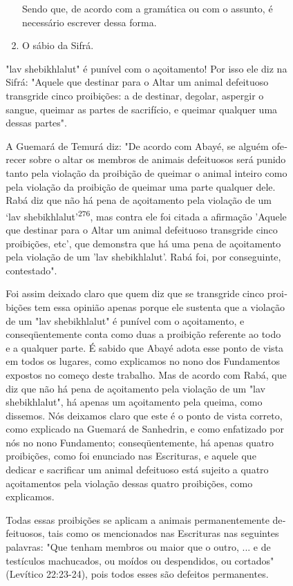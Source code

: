 \begin{itemize}
\begin{enumrate}
\begin{itemize}
\begin{itemize}
\begin{itemize}
\begin{enumerate}
 Sendo que, de acordo com a gramática ou com o assunto, é necessário
 escrever dessa forma.
 
\item
 
 O sábio da Sifrá.
 
\end{enumerate}



"lav shebikhlalut" é punível com o açoitamento! Por isso ele diz na
Sifrá: "Aquele que destinar para o Altar um animal defeituoso transgride
cinco proibições: a de destinar, degolar, aspergir o sangue, queimar as
partes de sacrifício, e quei­mar qualquer uma dessas partes".

A Guemará de Temurá diz: "De acordo com Abayé, se alguém ofe­recer sobre
o altar os membros de animais defeituosos será punido tanto pela
violação da proibição de queimar o animal inteiro como pela violação da
proi­bição de queimar uma parte qualquer dele. Rabá diz que não há pena
de açoita­mento pela violação de um `lav
shebikhlalut'\textsuperscript{276}, mas contra ele foi citada a
afir­mação 'Aquele que destinar para o Altar um animal defeituoso
transgride cinco proibições, etc', que demonstra que há uma pena de
açoitamento pela violação de um 'lav shebikhlalut'. Rabá foi, por
conseguinte, contestado".

Foi assim deixado claro que quem diz que se transgride cinco proi­bições
tem essa opinião apenas porque ele sustenta que a violação de um "lav
shebikhlalut" é punível com o açoitamento, e conseqüentemente conta como
duas a proibição referente ao todo e a qualquer parte. É sabido que
Abayé ado­ta esse ponto de vista em todos os lugares, como explicamos no
nono dos Fun­damentos expostos no começo deste trabalho. Mas de acordo
com Rabá, que diz que não há pena de açoitamento pela violação de um
"lav shebikhlalut", há apenas um açoitamento pela queima, como dissemos.
Nós deixamos claro que este é o ponto de vista correto, como explicado
na Guemará de Sanhedrin, e como enfatizado por nós no nono Fundamento;
conseqüentemente, há ape­nas quatro proibições, como foi enunciado nas
Escrituras, e aquele que dedicar e sacrificar um animal defeituoso está
sujeito a quatro açoitamentos pela viola­ção dessas quatro proibições,
como explicamos.

Todas essas proibições se aplicam a animais permanentemente
de­feituosos, tais como os mencionados nas Escrituras nas seguintes
palavras: "Que tenham membros ou maior que o outro, ... e de testículos
machucados, ou moí­dos ou despendidos, ou cortados" (Levítico 22:23-24),
pois todos esses são de­feitos permanentes.


\end{itemize}
\end{itemize}
\end{itemize}
\end{enumrate}
\end{itemize}
